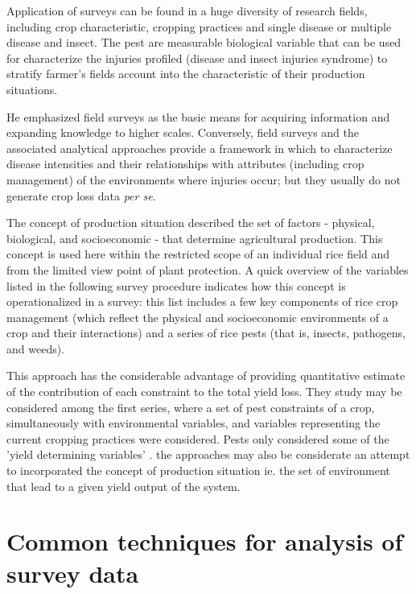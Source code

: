 Application of surveys can be found in a huge diversity of research fields, including crop characteristic, cropping practices and single disease or multiple disease and insect. The pest are measurable biological variable that can be used for characterize the injuries profiled (disease and insect injuries syndrome) to stratify farmer's fields account into the characteristic of their production situations.

He emphasized field surveys as the basic means for acquiring information and expanding knowledge to higher scales. Conversely, field surveys and the associated analytical approaches provide a framework in which to characterize disease intensities and their relationships with attributes (including crop management) of the environments where injuries occur; but they usually do not generate crop loss data \textit{per se}.

The concept of production situation described the set of factors - physical, biological, and socioeconomic - that determine agricultural production. This concept is used here within the restricted scope of an individual rice field and from the limited view point of plant protection. A quick overview of the variables listed in the following survey procedure indicates how this concept is operationalized in a survey: this list includes a few key components of rice crop management (which reflect the physical and socioeconomic environments of a crop and their interactions) and a series of rice pests (that is, insects, pathogens, and weeds).

This approach has the considerable advantage of providing quantitative estimate of the contribution of each constraint to the total yield loss. They study may be considered among the first series, where a set of pest constraints of a crop, simultaneously with environmental variables, and variables representing the current cropping practices were considered. Pests only considered some of the 'yield determining variables' . the approaches may also be considerate an attempt to incorporated the concept of production situation ie. the set of environment that lead to a given yield output of the system. 

\section*{Common techniques for analysis of survey data}

